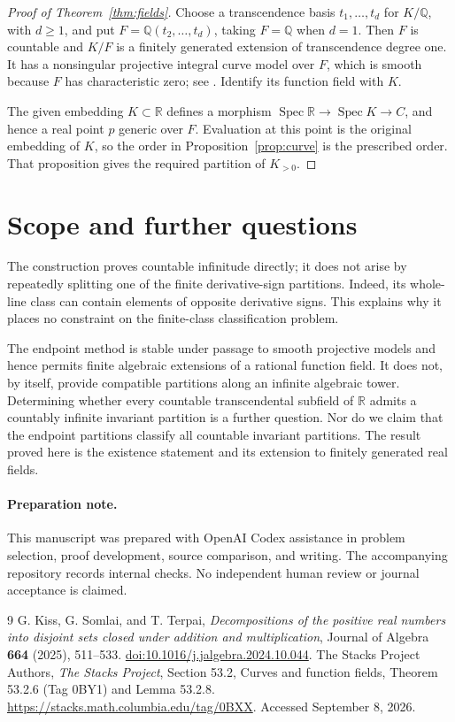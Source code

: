 \documentclass[11pt]{article}
\theoremstyle{remark}
\newcommand{\Q}{\mathbb Q}
\newcommand{\R}{\mathbb R}
\begin{document}
\begin{proof}[Proof of Theorem~\ref{thm:fields}]
Choose a transcendence basis $t_1,\ldots,t_d$ for $K/\Q$, with $d\geq1$, and put $F=\Q(t_2,\ldots,t_d)$, taking $F=\Q$ when $d=1$. Then $F$ is countable and $K/F$ is a finitely generated extension of transcendence degree one. It has a nonsingular projective integral curve model over $F$, which is smooth because $F$ has characteristic zero; see \cite[Theorem~53.2.6 and Lemma~53.2.8]{Stacks}. Identify its function field with $K$.

The given embedding $K\subset\R$ defines a morphism $\operatorname{Spec}\R\to\operatorname{Spec}K\to C$, and hence a real point $p$ generic over $F$. Evaluation at this point is the original embedding of $K$, so the order in Proposition~\ref{prop:curve} is the prescribed order. That proposition gives the required partition of $K_{>0}$.
\end{proof}

\section{Scope and further questions}
The construction proves countable infinitude directly; it does not arise by repeatedly splitting one of the finite derivative-sign partitions. Indeed, its whole-line class can contain elements of opposite derivative signs. This explains why it places no constraint on the finite-class classification problem.

The endpoint method is stable under passage to smooth projective models and hence permits finite algebraic extensions of a rational function field. It does not, by itself, provide compatible partitions along an infinite algebraic tower. Determining whether every countable transcendental subfield of $\R$ admits a countably infinite invariant partition is a further question. Nor do we claim that the endpoint partitions classify all countable invariant partitions. The result proved here is the existence statement and its extension to finitely generated real fields.

\paragraph{Preparation note.}
This manuscript was prepared with OpenAI Codex assistance in problem selection, proof development, source comparison, and writing. The accompanying repository records internal checks. No independent human review or journal acceptance is claimed.

\begin{thebibliography}{9}
G. Kiss, G. Somlai, and T. Terpai,
\emph{Decompositions of the positive real numbers into disjoint sets closed under addition and multiplication},
Journal of Algebra \textbf{664} (2025), 511--533.
\href{https://doi.org/10.1016/j.jalgebra.2024.10.044}{doi:10.1016/j.jalgebra.2024.10.044}.
The Stacks Project Authors,
\emph{The Stacks Project}, Section 53.2, Curves and function fields,
Theorem 53.2.6 (Tag 0BY1) and Lemma 53.2.8.
\url{https://stacks.math.columbia.edu/tag/0BXX}.
Accessed September 8, 2026.
\end{thebibliography}
\end{document}
